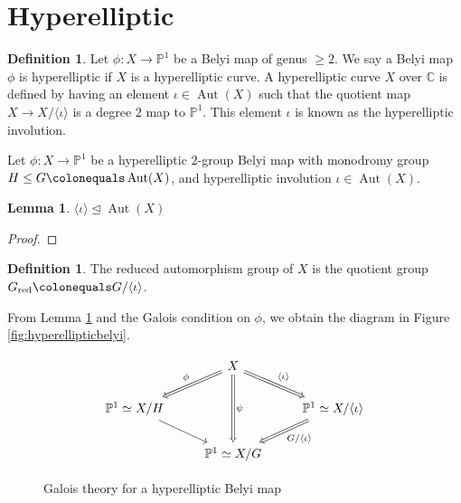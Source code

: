 \documentclass{dcthesis}
\newcommand{\PP}{\mathbb P}
\newcommand{\CC}{\mathbb C}
\newcommand{\defi}[1]{\textsf{#1}}
\DeclareMathOperator{\rred}{red}
\DeclareMathOperator{\Aut}{Aut}
\newtheorem{lemma}[prop]{Lemma}
\theoremstyle{definition}
\newtheorem{definition}[prop]{Definition}
\theoremstyle{remark}
\numberwithin{equation}{section}
\numberwithin{figure}{section}
\begin{document}
{  \section{Hyperelliptic}{\label{sec:hyperelliptic}
    \begin{definition}\label{def:hyperelliptic}
      Let $\phi\colon X\to\PP^1$ be a Belyi map
      of genus $\geq 2$.
      We say a Belyi map $\phi$ is \defi{hyperelliptic}
      if $X$ is a hyperelliptic curve.
      A hyperelliptic curve $X$ over $\CC$
      is defined by having
      an element $\iota\in\Aut(X)$
      such that
      the quotient map
      $X\to X/\langle\iota\rangle$
      is a degree $2$ map to $\PP^1$.
      This element $\iota$ is known as the
      \defi{hyperelliptic involution}.
    \end{definition}
    Let $\phi\colon X\to\PP^1$ be a hyperelliptic
    $2$-group Belyi map with monodromy group
    $H\leq G\colonequals\Aut(X)$,
    and hyperelliptic involution $\iota\in\Aut(X)$.
    \begin{lemma}\label{lem:hypinvolutioncentral}
      $\langle\iota\rangle\trianglelefteq\Aut(X)$
    \end{lemma}
    \begin{proof}
    \end{proof}
    \begin{definition}\label{def:reducedautomorphismgroup}
      The
      \defi{reduced automorphism group} of $X$
      is the quotient group
      $G_{\rred}\colonequals G/\langle\iota\rangle$.
    \end{definition}
    From Lemma \ref{lem:hypinvolutioncentral}
    and the Galois condition on $\phi$,
    we obtain the diagram in Figure \ref{fig:hyperellipticbelyi}.
    \begin{figure}[ht]
      \[
        \begin{tikzcd}
          &X\arrow[swap, Rightarrow]{dl}{\phi}\arrow[Rightarrow]{dr}{\langle\iota\rangle}
          \arrow[Rightarrow]{dd}{\psi}\\
          \PP^1\simeq X/H\arrow{dr}&&\PP^1\simeq X/\langle\iota\rangle\arrow[Rightarrow]{dl}{G/\langle\iota\rangle}\\
                         &\PP^1\simeq X/G
        \end{tikzcd}
      \]
      \caption{Galois theory for a hyperelliptic Belyi map}

\end{figure}}}
\end{document}
